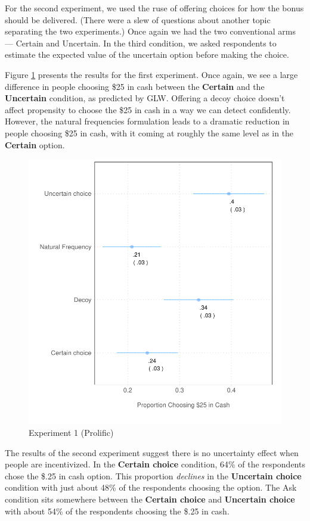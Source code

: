 \documentclass[12pt, letterpaper]{article}
\begin{document}
For the second experiment, we used the ruse of offering choices for how the bonus should be delivered. (There were a slew of questions about another topic separating the two experiments.) Once again we had the two conventional arms --- Certain and Uncertain. In the third condition, we asked respondents to estimate the expected value of the uncertain option before making the choice.

Figure \ref{fig:exp_1_prolific} presents the results for the first experiment. Once again, we see a large difference in people choosing \$25 in cash between the \textbf{Certain} and the \textbf{Uncertain} condition, as predicted by GLW. Offering a decoy choice doesn't affect propensity to choose the \$25 in cash in a way we can detect confidently. However, the natural frequencies formulation leads to a dramatic reduction in people choosing \$25 in cash, with it coming at roughly the same level as in the \textbf{Certain} option.

\begin{figure}[h]
    \centering
    \includegraphics{figs/prolific_exp1.pdf}
    \caption{Experiment 1 (Prolific)}
    \label{fig:exp_1_prolific}
\end{figure}

The results of the second experiment suggest there is no uncertainty effect when people are incentivized. In the \textbf{Certain choice} condition, 64\% of the respondents chose the \$.25 in cash option. This proportion \textit{declines} in the \textbf{Uncertain choice} condition with just about 48\% of the respondents choosing the option. The Ask condition sits somewhere between the \textbf{Certain choice} and \textbf{Uncertain choice} with about 54\% of the respondents choosing the \$.25 in cash.
\end{document}
